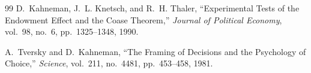 \documentclass[12pt]{article}
\begin{document}
\begin{thebibliography}{99}
D.~Kahneman, J.~L. Knetsch, and R.~H. Thaler, ``Experimental Tests of the Endowment Effect and the Coase Theorem,'' \emph{Journal of Political Economy}, vol.~98, no.~6, pp.~1325--1348, 1990.

A.~Tversky and D.~Kahneman, ``The Framing of Decisions and the Psychology of Choice,'' \emph{Science}, vol.~211, no.~4481, pp.~453--458, 1981.

\end{thebibliography}
\end{document}
